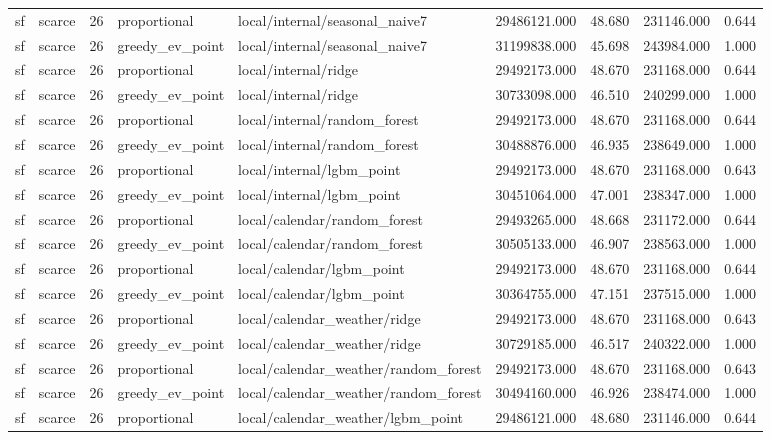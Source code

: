 \begin{tabular}{llrllrrrr}
sf & scarce & 26 & proportional & local/internal/seasonal\_naive7 & 29486121.000 & 48.680 & 231146.000 & 0.644 \\
sf & scarce & 26 & greedy\_ev\_point & local/internal/seasonal\_naive7 & 31199838.000 & 45.698 & 243984.000 & 1.000 \\
sf & scarce & 26 & proportional & local/internal/ridge & 29492173.000 & 48.670 & 231168.000 & 0.644 \\
sf & scarce & 26 & greedy\_ev\_point & local/internal/ridge & 30733098.000 & 46.510 & 240299.000 & 1.000 \\
sf & scarce & 26 & proportional & local/internal/random\_forest & 29492173.000 & 48.670 & 231168.000 & 0.644 \\
sf & scarce & 26 & greedy\_ev\_point & local/internal/random\_forest & 30488876.000 & 46.935 & 238649.000 & 1.000 \\
sf & scarce & 26 & proportional & local/internal/lgbm\_point & 29492173.000 & 48.670 & 231168.000 & 0.643 \\
sf & scarce & 26 & greedy\_ev\_point & local/internal/lgbm\_point & 30451064.000 & 47.001 & 238347.000 & 1.000 \\
sf & scarce & 26 & proportional & local/calendar/random\_forest & 29493265.000 & 48.668 & 231172.000 & 0.644 \\
sf & scarce & 26 & greedy\_ev\_point & local/calendar/random\_forest & 30505133.000 & 46.907 & 238563.000 & 1.000 \\
sf & scarce & 26 & proportional & local/calendar/lgbm\_point & 29492173.000 & 48.670 & 231168.000 & 0.644 \\
sf & scarce & 26 & greedy\_ev\_point & local/calendar/lgbm\_point & 30364755.000 & 47.151 & 237515.000 & 1.000 \\
sf & scarce & 26 & proportional & local/calendar\_weather/ridge & 29492173.000 & 48.670 & 231168.000 & 0.643 \\
sf & scarce & 26 & greedy\_ev\_point & local/calendar\_weather/ridge & 30729185.000 & 46.517 & 240322.000 & 1.000 \\
sf & scarce & 26 & proportional & local/calendar\_weather/random\_forest & 29492173.000 & 48.670 & 231168.000 & 0.643 \\
sf & scarce & 26 & greedy\_ev\_point & local/calendar\_weather/random\_forest & 30494160.000 & 46.926 & 238474.000 & 1.000 \\
sf & scarce & 26 & proportional & local/calendar\_weather/lgbm\_point & 29486121.000 & 48.680 & 231146.000 & 0.644 \\

\end{tabular}
